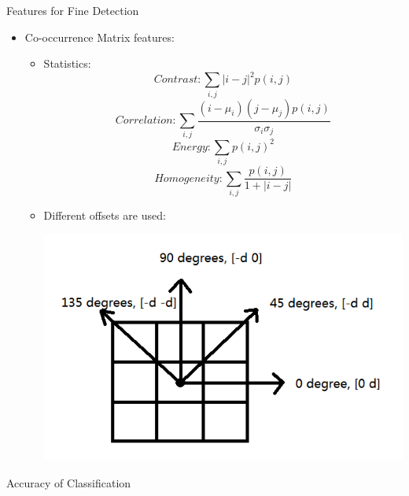 \documentclass[a0paper,portrait]{baposter}
\begin{document}
\begin{poster}
\begin{posterbox}[name=feature,column=1,below = example]{Features for Fine Detection}
\begin{itemize}
  \item Co-occurrence Matrix features:
  \begin{itemize}
    \item Statistics:
    \begin{equation}
        Contrast: \sum_{i,j} |i-j|^2 p(i,j)
    \end{equation}
    \begin{equation}
        Correlation: \sum_{i,j} \frac{(i-\mu_i)(j-\mu_j)p(i,j)}{\sigma_i\sigma_j}
    \end{equation}
    \begin{equation}
        Energy: \sum_{i,j} p(i,j)^2
    \end{equation}
    \begin{equation}
        Homogeneity: \sum_{i,j} \frac{p(i,j)}{1+|i-j|}
    \end{equation}

    \item Different offsets are used:
    \begin{center}
        \includegraphics[width=1.3\headerheight]{offset}
        \label{fig:figlabel}
    \end{center}

  \end{itemize}
\end{itemize}


\end{posterbox}






\begin{posterbox}[name=accuracy,column=1,below=feature,above=bottom]{Accuracy of Classification}


\end{posterbox}
\end{poster}
\end{document}
